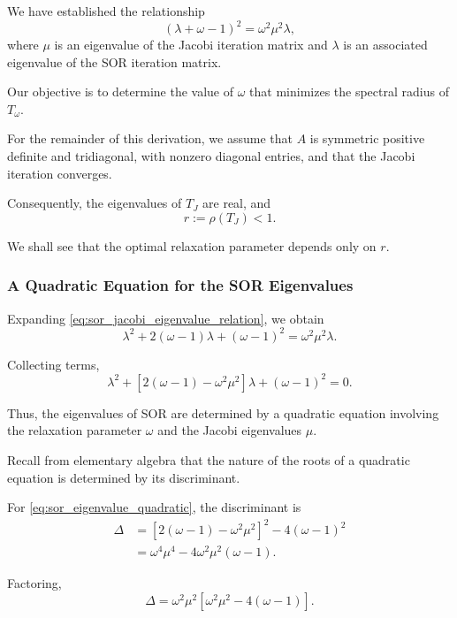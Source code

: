 \documentclass[11pt,a4paper]{article}
\theoremstyle{definition}
\theoremstyle{remark}
\begin{document}
We have established the relationship
\begin{equation}
    (\lambda+\omega-1)^2
    =
    \omega^2\mu^2\lambda,
    \label{eq:sor_jacobi_eigenvalue_relation}
\end{equation}
where $\mu$ is an eigenvalue of the Jacobi
iteration matrix and $\lambda$ is an
associated eigenvalue of the SOR iteration
matrix.

Our objective is to determine the value of
$\omega$ that minimizes the spectral radius
of $T_\omega$.

For the remainder of this derivation, we
assume that $A$ is symmetric positive definite
and tridiagonal, with nonzero diagonal entries,
and that the Jacobi iteration converges.

Consequently, the eigenvalues of $T_J$ are
real, and
\[
    r:=\rho(T_J)<1.
\]

We shall see that the optimal relaxation
parameter depends only on $r$.

\subsubsection*{A Quadratic Equation for the SOR Eigenvalues}

Expanding \eqref{eq:sor_jacobi_eigenvalue_relation},
we obtain
\[
    \lambda^2
    +2(\omega-1)\lambda
    +(\omega-1)^2
    =
    \omega^2\mu^2\lambda.
\]

Collecting terms,
\begin{equation}
\boxed{
    \lambda^2
    +
    \left[
        2(\omega-1)-\omega^2\mu^2
    \right]\lambda
    +
    (\omega-1)^2
    =0.
}
\label{eq:sor_eigenvalue_quadratic}
\end{equation}

Thus, the eigenvalues of SOR are determined
by a quadratic equation involving the
relaxation parameter $\omega$ and the
Jacobi eigenvalues $\mu$.

Recall from elementary algebra that the
nature of the roots of a quadratic equation
is determined by its discriminant.

For \eqref{eq:sor_eigenvalue_quadratic},
the discriminant is
\[
\begin{aligned}
\Delta
&=
\left[
2(\omega-1)-\omega^2\mu^2
\right]^2
-4(\omega-1)^2
\\
&=
\omega^4\mu^4
-4\omega^2\mu^2(\omega-1).
\end{aligned}
\]

Factoring,
\begin{equation}
\boxed{
    \Delta
    =
    \omega^2\mu^2
    \left[
        \omega^2\mu^2-4(\omega-1)
    \right].
}
\label{eq:sor_discriminant}
\end{equation}
\end{document}
